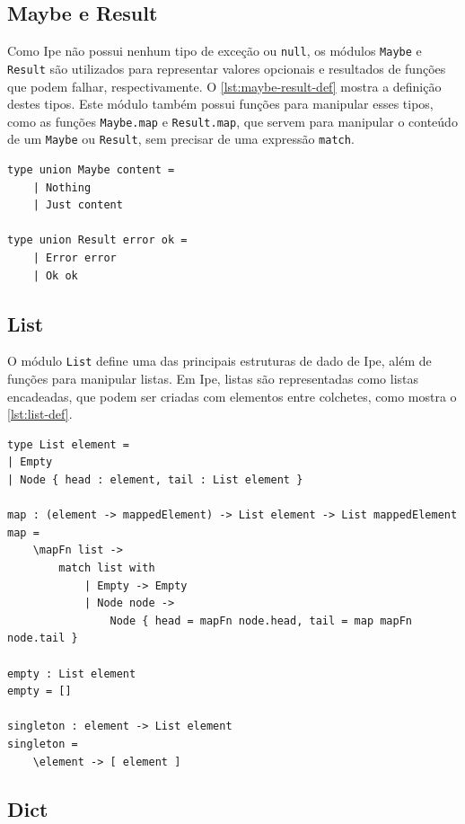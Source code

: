 \subsection{Maybe e Result}

Como Ipe não possui nenhum tipo de exceção ou \texttt{null}, os módulos \texttt{Maybe}
e \texttt{Result} são utilizados para representar valores opcionais e resultados
de funções que podem falhar, respectivamente. O \autoref{lst:maybe-result-def}
mostra a definição destes tipos. Este módulo também possui funções para manipular
esses tipos, como as funções \texttt{Maybe.map} e \texttt{Result.map}, que servem
para manipular o conteúdo de um \texttt{Maybe} ou \texttt{Result}, sem precisar
de uma expressão \texttt{match}.

\begin{lstlisting}[label={lst:maybe-result-def},caption={Definição de \texttt{Maybe} e \texttt{Result}}]
type union Maybe content =
    | Nothing
    | Just content

type union Result error ok =
    | Error error
    | Ok ok
\end{lstlisting}


\subsection{List}

O módulo \texttt{List} define uma das principais estruturas de dado de Ipe,
além de funções para manipular listas. Em Ipe, listas são representadas como
listas encadeadas, que podem ser criadas com elementos entre colchetes,
como mostra o \autoref{lst:list-def}.

\begin{lstlisting}[label={lst:list-def},caption={Definição de listas em Ipe}]
type List element =
| Empty
| Node { head : element, tail : List element }

map : (element -> mappedElement) -> List element -> List mappedElement
map =
    \mapFn list ->
        match list with
            | Empty -> Empty
            | Node node ->
                Node { head = mapFn node.head, tail = map mapFn node.tail }

empty : List element
empty = []

singleton : element -> List element
singleton =
    \element -> [ element ]

\end{lstlisting}

\subsection{Dict}

